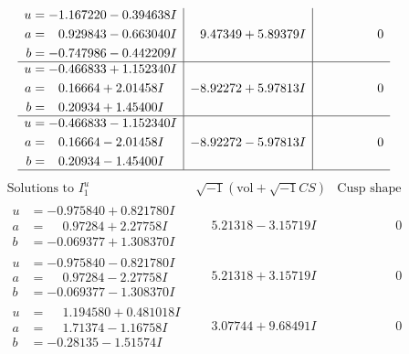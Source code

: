 \documentclass[1p]{elsarticle_modified}
\theoremstyle{definition}
\newcommand{\I}{\sqrt{-1}}
\begin{document}
$$\begin{array}{c|c|c}
\begin{aligned}
u &= -1.167220 - 0.394638 I \\
a &= \phantom{-}0.929843 - 0.663040 I \\
b &= -0.747986 - 0.442209 I\end{aligned}
 & \phantom{-}9.47349 + 5.89379 I & \phantom{-0.000000 } 0 \\ \hline\begin{aligned}
u &= -0.466833 + 1.152340 I \\
a &= \phantom{-}0.16664 + 2.01458 I \\
b &= \phantom{-}0.20934 + 1.45400 I\end{aligned}
 & -8.92272 + 5.97813 I & \phantom{-0.000000 } 0 \\ \hline\begin{aligned}
u &= -0.466833 - 1.152340 I \\
a &= \phantom{-}0.16664 - 2.01458 I \\
b &= \phantom{-}0.20934 - 1.45400 I\end{aligned}
 & -8.92272 - 5.97813 I & \phantom{-0.000000 } 0\\
 \hline 
 \end{array}$$\newpage$$\begin{array}{c|c|c}  
\text{Solutions to }I^u_{1}& \I (\text{vol} + \sqrt{-1}CS) & \text{Cusp shape}\\
 \hline 
\begin{aligned}
u &= -0.975840 + 0.821780 I \\
a &= \phantom{-}0.97284 + 2.27758 I \\
b &= -0.069377 + 1.308370 I\end{aligned}
 & \phantom{-}5.21318 - 3.15719 I & \phantom{-0.000000 } 0 \\ \hline\begin{aligned}
u &= -0.975840 - 0.821780 I \\
a &= \phantom{-}0.97284 - 2.27758 I \\
b &= -0.069377 - 1.308370 I\end{aligned}
 & \phantom{-}5.21318 + 3.15719 I & \phantom{-0.000000 } 0 \\ \hline\begin{aligned}
u &= \phantom{-}1.194580 + 0.481018 I \\
a &= \phantom{-}1.71374 - 1.16758 I \\
b &= -0.28135 - 1.51574 I\end{aligned}
 & \phantom{-}3.07744 + 9.68491 I & \phantom{-0.000000 } 0 \\ \hline\begin{aligned}

\end{aligned}
\end{array}$$
\end{document}
